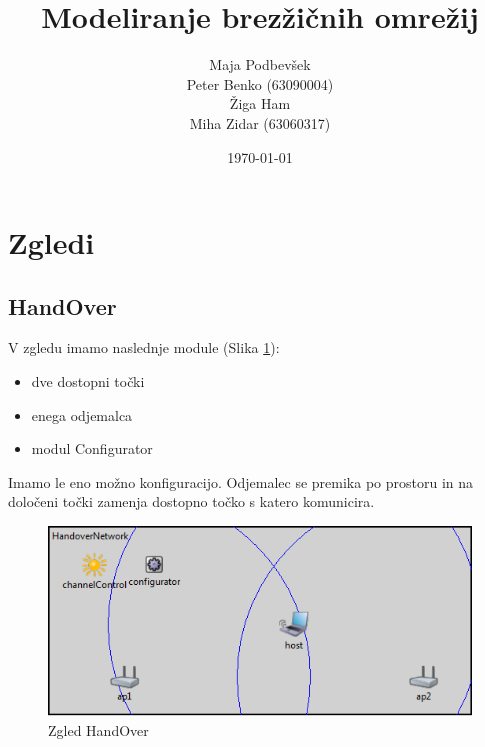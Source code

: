 \documentclass[a4paper,11pt]{article}
\title{Modeliranje brez\v{z}i\v{c}nih omre\v{z}ij}
\author{
    Maja Podbevšek\\
    Peter Benko (63090004)\\
    \v{Z}iga Ham\\
    Miha Zidar (63060317)
}
\date{\today}
\begin{document}
\maketitle

\pagebreak

\tableofcontents

\pagebreak

\section{Zgledi}



\subsection{HandOver}

V zgledu imamo naslednje module (Slika \ref{image:handover}):

\begin{itemize}
    \item dve dostopni točki
    \item enega odjemalca
    \item modul Configurator
\end{itemize}

Imamo le eno možno konfiguracijo. Odjemalec se premika po prostoru in na določeni točki zamenja dostopno točko s katero komunicira. 

\begin{figure}[htbp]
    \begin{center}
        \includegraphics[scale=0.8]{img/zgledi/handover.png}
        \caption{Zgled HandOver}
        \label{image:handover}
    \end{center}
\end{figure}

\end{document}

